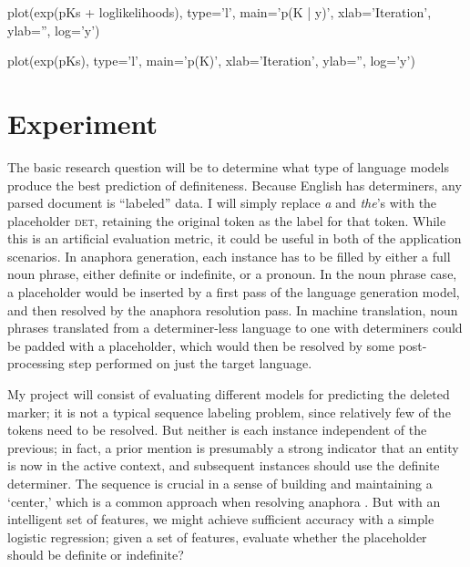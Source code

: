 \documentclass[11pt]{article}
\begin{document}
plot(exp(pKs + loglikelihoods), type='l',
     main='p(K | y)', xlab='Iteration', ylab='', log='y')

plot(exp(pKs), type='l',
     main='p(K)', xlab='Iteration', ylab='', log='y')


















\section{Experiment}
The basic research question will be to determine what type of language models produce the best prediction of definiteness. Because English has determiners, any parsed document is ``labeled'' data. I will simply replace \emph{a} and \emph{the}'s with the placeholder \guillemotleft\textsc{det}\guillemotright, retaining the original token as the label for that token. While this is an artificial evaluation metric, it could be useful in both of the application scenarios. In anaphora generation, each instance has to be filled by either a full noun phrase, either definite or indefinite, or a pronoun. In the noun phrase case, a placeholder would be inserted by a first pass of the language generation model, and then resolved by the anaphora resolution pass. In machine translation, noun phrases translated from a determiner-less language to one with determiners could be padded with a placeholder, which would then be resolved by some post-processing step performed on just the target language.

My project will consist of evaluating different models for predicting the deleted marker; it is not a typical sequence labeling problem, since relatively few of the tokens need to be resolved. But neither is each instance independent of the previous; in fact, a prior mention is presumably a strong indicator that an entity is now in the active context, and subsequent instances should use the definite determiner. The sequence is crucial in a sense of building and maintaining a `center,' which is a common approach when resolving anaphora \citep{grosz:1995, beaver:2000}.
But with an intelligent set of features, we might achieve sufficient accuracy with a simple logistic regression; given a set of features, evaluate whether the placeholder should be definite or indefinite?
\end{document}
